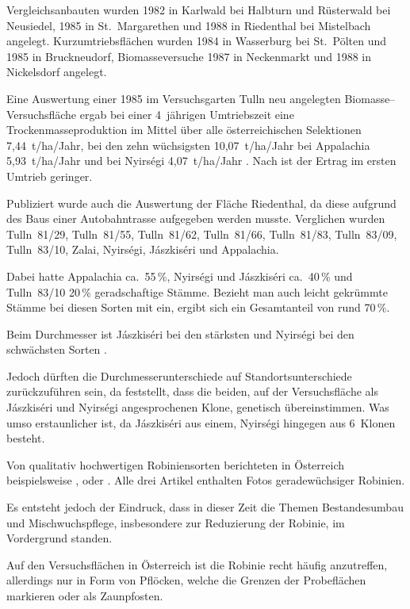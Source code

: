 \documentclass[twocolumn]{scrartcl}
\begin{document}
Vergleichsanbauten wurden 1982 in Karlwald bei Halbturn und Rüsterwald
bei Neusiedel, 1985 in St.~Margarethen und 1988 in Riedenthal bei
Mistelbach angelegt. Kurzumtriebsflächen wurden 1984 in Wasserburg bei
St.~Pölten und 1985 in Bruckneudorf, Biomasseversuche 1987 in
Neckenmarkt und 1988 in Nickelsdorf angelegt.

Eine Auswertung einer 1985 im Versuchsgarten Tulln neu angelegten
Biomasse--Versuchsfläche ergab bei einer 4~jährigen Umtriebszeit eine
Trockenmasseproduktion im Mittel über alle österreichischen
Selektionen 7,44~t/ha/Jahr, bei den zehn wüchsigsten 10,07~t/ha/Jahr
bei Appalachia 5,93~t/ha/Jahr und bei Nyirségi 4,07~t/ha/Jahr
\citep{mueller1991robinie}. Nach \citet{redei2005robinieEnergieholz}
ist der Ertrag im ersten Umtrieb geringer.

Publiziert wurde auch die Auswertung der Fläche Riedenthal, da diese
aufgrund des Baus einer Autobahntrasse aufgegeben werden
musste. Verglichen wurden Tulln~81/29, Tulln~81/55, Tulln~81/62,
Tulln~81/66, Tulln~81/83, Tulln~83/09, Tulln~83/10, Zalai, Nyirségi,
Jászkiséri und Appalachia.

Dabei hatte Appalachia ca.\ 55\,\%, Nyirségi und Jászkiséri
ca.\ 40\,\% und Tulln~83/10 20\,\% geradschaftige Stämme.  Bezieht man
auch leicht gekrümmte Stämme bei diesen Sorten mit ein, ergibt sich
ein Gesamtanteil von rund 70\,\%.

Beim Durchmesser ist Jászkiséri bei den stärksten und Nyirségi bei den
schwächsten Sorten \citep{schueler2006robinie}.

Jedoch dürften die Durchmesserunterschiede auf Standortsunterschiede
zurückzuführen sein, da \citet{heinze2014robinie} feststellt, dass die
beiden, auf der Versuchsfläche als Jászkiséri und Nyirségi
angesprochenen Klone, genetisch übereinstimmen. Was umso erstaunlicher
ist, da Jászkiséri aus einem, Nyirségi hingegen aus 6~Klonen besteht.

Von qualitativ hochwertigen Robiniensorten berichteten in Österreich
beispielsweise \citet{mueller1991robinie}, \citet{iby1998robinie} oder
\citet{demel2004robinie}. Alle drei Artikel enthalten Fotos
geradewüchsiger Robinien.

Es entsteht jedoch der Eindruck, dass in dieser Zeit die Themen
Bestandesumbau und Mischwuchspflege, insbesondere zur Reduzierung der
Robinie, im Vordergrund standen.

Auf den Versuchsflächen in Österreich ist die Robinie recht häufig
anzutreffen, allerdings nur in Form von Pflöcken, welche die Grenzen
der Probeflächen markieren oder als Zaunpfosten.
\end{document}
